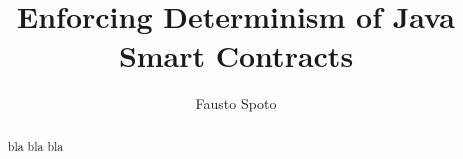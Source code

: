 \documentclass[orivec]{llncs}
\begin{document}
%
\begin{frontmatter}
\title{Enforcing Determinism of Java Smart Contracts}
\author{Fausto Spoto}
%
\maketitle
%
\begin{abstract}
  bla bla bla
\end{abstract}
%
\end{frontmatter}










\end{document}
